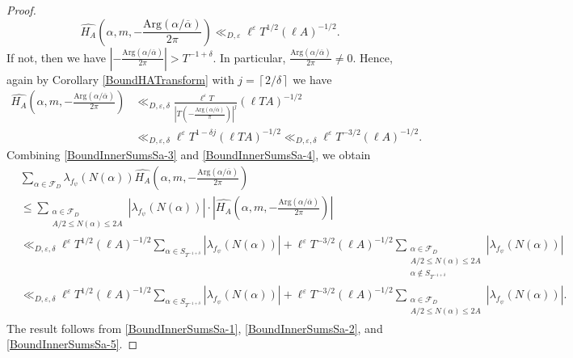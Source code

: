 \documentclass[10pt,a4paper]{amsart}
\begin{document}
\begin{proof}
\begin{equation}
    \widehat{H_A}\left(\alpha,m,-\frac{\mathrm{Arg}(\alpha/\overline{\alpha})}{2 \pi} \right) \ll_{D,\varepsilon} \ell^{\varepsilon} T^{1/2} (\ell A)^{-1/2}. \label{BoundInnerSumsSa-3}
\end{equation}
If not, then we have $\left|-\frac{\mathrm{Arg}(\alpha/\overline{\alpha})}{2 \pi} \right| > T^{-1+\delta}$. In particular, $\frac{\mathrm{Arg}(\alpha/\overline{\alpha})}{2 \pi} \neq 0$. Hence, again by Corollary \ref{BoundHATransform} with $j=\left\lceil 2/\delta \right\rceil$ we have 
\begin{align}
    \widehat{H_A}\left(\alpha,m,-\frac{\mathrm{Arg}(\alpha/\overline{\alpha})}{2\pi} \right) &\ll_{D,\varepsilon,\delta} \frac{\ell^{\varepsilon} T}{\left| T\left( -\frac{\mathrm{Arg}(\alpha/\overline{\alpha})}{\pi} \right) \right|^{j}}  (\ell TA)^{-1/2} \label{BoundInnerSumsSa-4} \\
    &\ll_{D,\varepsilon,\delta} \ell^{\varepsilon} T^{1-\delta j} (\ell TA)^{-1/2} \ll_{D,\varepsilon,\delta} \ell^{\varepsilon} T^{-3/2} (\ell A)^{-1/2}. \nonumber
\end{align}
Combining \eqref{BoundInnerSumsSa-3} and \eqref{BoundInnerSumsSa-4}, we obtain
\begin{align}
    &\sum_{\alpha \in \mathcal{F}_{D}} \lambda_{f_{\psi}}(N(\alpha)) \widehat{H_A}\left( \alpha,m,-\frac{\mathrm{Arg}(\alpha/\overline{\alpha})}{2 \pi} \right) \label{BoundInnerSumsSa-5} \\
    &\leq \sum_{\substack{\alpha \in \mathcal{F}_{D} \\ A/2 \leq N(\alpha) \leq 2A}} |\lambda_{f_{\psi}}(N(\alpha))| \cdot \left| \widehat{H_A}\left( \alpha,m,-\frac{\mathrm{Arg}(\alpha/\overline{\alpha})}{2 \pi} \right) \right| \nonumber \\
    &\ll_{D,\varepsilon, \delta} \ell^{\varepsilon} T^{1/2} (\ell A)^{-1/2} \sum_{\alpha\in S_{T^{-1+\delta}}} |\lambda_{f_{\psi}}(N(\alpha))| + \ell^{\varepsilon} T^{-3/2} (\ell A)^{-1/2} \sum_{\substack{\alpha \in \mathcal{F}_{D} \\ A/2 \leq N(\alpha) \leq 2A \\ \alpha \notin S_{T^{-1+\delta}} }} |\lambda_{f_{\psi}}(N(\alpha))| \nonumber \\
    &\ll_{D,\varepsilon, \delta} \ell^{\varepsilon} T^{1/2} (\ell A)^{-1/2} \sum_{\alpha\in S_{T^{-1+\delta}}} |\lambda_{f_{\psi}}(N(\alpha))| + \ell^{\varepsilon} T^{-3/2} (\ell A)^{-1/2} \sum_{\substack{\alpha \in \mathcal{F}_{D} \\ A/2 \leq N(\alpha) \leq 2A}} |\lambda_{f_{\psi}}(N(\alpha))|. \nonumber
\end{align}
The result follows from \eqref{BoundInnerSumsSa-1}, \eqref{BoundInnerSumsSa-2}, and \eqref{BoundInnerSumsSa-5}.
\end{proof}
\end{document}
